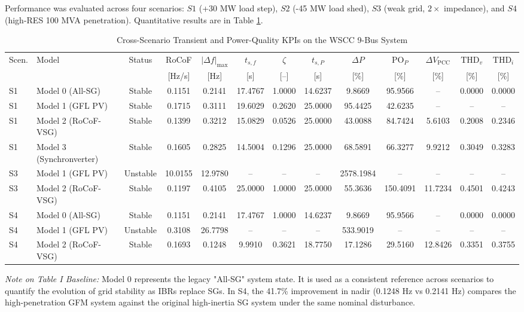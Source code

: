 \documentclass[conference]{IEEEtran}
\begin{document}
Performance was evaluated across four scenarios: $S1$ (+30 MW load step), $S2$ (-45 MW load shed), $S3$ (weak grid, $2\times$ impedance), and $S4$ (high-RES 100 MVA penetration). Quantitative results are in Table \ref{tab:all_kpis}.

\begin{table}[t]
\centering
\caption{Cross-Scenario Transient and Power-Quality KPIs on the WSCC 9-Bus System}
\label{tab:all_kpis}
\scriptsize
\begin{tabular}{llccccccccccc}
\toprule
Scen. & Model & Status & RoCoF & $|\Delta f|_{\max}$ & $t_{s,f}$ & $\zeta$ & $t_{s,P}$ & $\Delta P$ & $\text{PO}_P$ & $\Delta V_{\text{PCC}}$ & $\text{THD}_v$ & $\text{THD}_i$ \\
 & & & [Hz/s] & [Hz] & [s] & [--] & [s] & [\%] & [\%] & [\%] & [\%] & [\%] \\
\midrule
S1 & Model 0 (All-SG) & Stable & 0.1151 & 0.2141 & 17.4767 & 1.0000 & 14.6237 & 9.8669 & 95.9566 & -- & 0.0000 & 0.0000 \\
S1 & Model 1 (GFL PV) & Stable & 0.1715 & 0.3111 & 19.6029 & 0.2620 & 25.0000 & 95.4425 & 42.6235 & -- & -- & -- \\
S1 & Model 2 (RoCoF-VSG) & Stable & 0.1399 & 0.3212 & 15.0829 & 0.0526 & 25.0000 & 43.0088 & 84.7424 & 5.6103 & 0.2008 & 0.2346 \\
S1 & Model 3 (Synchronverter) & Stable & 0.1605 & 0.2825 & 14.5004 & 0.1296 & 25.0000 & 68.5891 & 66.3277 & 9.9212 & 0.3049 & 0.3283 \\
\midrule
S3 & Model 1 (GFL PV) & Unstable & 10.0155 & 12.9780 & -- & -- & -- & 2578.1984 & -- & -- & -- & -- \\
S3 & Model 2 (RoCoF-VSG) & Stable & 0.1197 & 0.4105 & 25.0000 & 1.0000 & 25.0000 & 55.3636 & 150.4091 & 11.7234 & 0.4501 & 0.4243 \\
\midrule
S4 & Model 0 (All-SG) & Stable & 0.1151 & 0.2141 & 17.4767 & 1.0000 & 14.6237 & 9.8669 & 95.9566 & -- & 0.0000 & 0.0000 \\
S4 & Model 1 (GFL PV) & Unstable & 0.3108 & 26.7798 & -- & -- & -- & 533.9019 & -- & -- & -- & -- \\
S4 & Model 2 (RoCoF-VSG) & Stable & 0.1693 & 0.1248 & 9.9910 & 0.3621 & 18.7750 & 17.1286 & 29.5160 & 12.8426 & 0.3351 & 0.3755 \\
\bottomrule
\end{tabular}
\end{table}

\textit{Note on Table I Baseline:} Model 0 represents the legacy "All-SG" system state. It is used as a consistent reference across scenarios to quantify the evolution of grid stability as IBRs replace SGs. In S4, the 41.7\% improvement in nadir (0.1248 Hz vs 0.2141 Hz) compares the high-penetration GFM system against the original high-inertia SG system under the same nominal disturbance.
\end{document}
